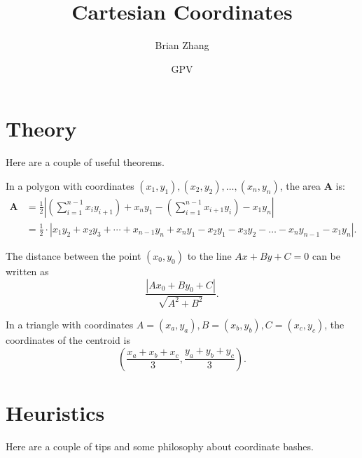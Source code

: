 \documentclass{article}
\title{Cartesian Coordinates}
\author{Brian Zhang}
\date{GPV}
\begin{document}
\maketitle
\section{Theory}

Here are a couple of useful theorems.

\begin{theo}[Shoelace]
In a polygon with coordinates $(x_1,y_1),(x_2,y_2),\dots,(x_n,y_n)$, the area $\mathbf{A}$ is:
\begin{align*}
    \mathbf{A} &= \frac{1}{2}\left|\left(\sum_{i=1}^{n-1}x_iy_{i+1}\right)+ x_ny_1-\left(\sum_{i=1}^{n-1}x_{i+1}y_i\right)-x_1y_n\right|\\ 
    &=\frac{1}{2}\cdot |x_1y_2+x_2y_3+\cdots + x_{n-1}y_n+x_ny_1-x_2y_1-x_3y_2-\dots-x_ny_{n-1}-x_1y_n|.
\end{align*}
\end{theo}

\begin{theo}
The distance between the point $(x_0,y_0)$ to the line $Ax+By+C=0$ can be written as 
\[\frac{|Ax_0+By_0+C|}{\sqrt{A^2+B^2}}.\]
\end{theo}

\begin{theo}
In a triangle with coordinates $A=(x_a,y_a),B=(x_b,y_b),C=(x_c,y_c)$, the coordinates of the centroid is
\[\left(\frac{x_a+x_b+x_c}{3},\frac{y_a+y_b+y_c}{3}\right).\]
\end{theo}

\section{Heuristics}

Here are a couple of tips and some philosophy about coordinate bashes.
\end{document}
